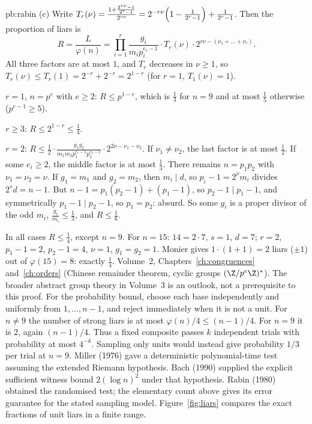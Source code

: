 \begin{solution}{pb:rabin}
(c) Write $T_r(\nu)=\frac{1+\frac{2^{r\nu}-1}{2^r-1}}{2^{r\nu}}=2^{-r\nu}\Bigl(1-\frac1{2^r-1}\Bigr)+\frac1{2^r-1}$. Then the proportion of liars is
\[
R=\frac{L}{\varphi(n)}=\prod_{i=1}^r\frac{g_i}{m_ip_i^{e_i-1}}\cdot T_r(\nu)\cdot2^{r\nu-(\nu_1+\dots+\nu_r)}.
\]
All three factors are at most $1$, and $T_r$ decreases in $\nu\ge1$, so $T_r(\nu)\le T_r(1)=2^{-r}+2^{-r}=2^{1-r}$ (for $r=1$,
$T_1(\nu)=1$).

\emph{$r=1$}, $n=p^e$ with $e\ge2$: $R\le p^{1-e}$, which is $\frac13$ for $n=9$ and at most $\frac15$ otherwise ($p^{e-1}\ge5$).

\emph{$r\ge3$}: $R\le2^{1-r}\le\frac14$.

\emph{$r=2$}: $R\le\frac12\cdot\frac{g_1g_2}{m_1m_2p_1^{e_1-1}p_2^{e_2-1}}\cdot2^{2\nu-\nu_1-\nu_2}$. If $\nu_1\ne\nu_2$, the last factor is at most
$\frac12$. If some $e_i\ge2$, the middle factor is at most $\frac13$. There remains $n=p_1p_2$ with $\nu_1=\nu_2=\nu$. If
$g_1=m_1$ and $g_2=m_2$, then $m_i\mid d$, so $p_i-1=2^\nu m_i$ divides $2^sd=n-1$. But $n-1=p_1(p_2-1)+(p_1-1)$, so $p_2-1\mid p_1-1$,
and symmetrically $p_1-1\mid p_2-1$, so $p_1=p_2$: absurd. So some $g_i$ is a proper divisor of the odd $m_i$, $\frac{g_i}{m_i}\le\frac13$,
and $R\le\frac16$.

In all cases $R\le\frac14$, except $n=9$. For $n=15$: $14=2\cdot7$, $s=1$, $d=7$; $r=2$, $p_1-1=2$, $p_2-1=4$, $\nu=1$, $g_1=g_2=1$. Monier
gives $1\cdot(1+1)=2$ liars ($\pm1$) out of $\varphi(15)=8$: exactly $\frac14$.
\tools Volume~2, Chapters~\ref{ch:congruences} and~\ref{ch:orders}
(Chinese remainder theorem, cyclic groups $(\Z/p^e\Z)^*$).
The broader abstract group theory in Volume~3 is an outlook, not a
prerequisite to this proof.
For the probability bound, choose each base independently and uniformly from $1,\ldots,n-1$, and reject immediately when it is not a unit. For $n\ne9$ the number of strong liars is at most $\varphi(n)/4\le(n-1)/4$. For $n=9$ it is $2$, again $(n-1)/4$. Thus a fixed composite passes $k$ independent trials with probability at most $4^{-k}$. Sampling only units would instead give probability $1/3$ per trial at $n=9$.
\leads Miller (1976) gave a deterministic polynomial-time test assuming the extended Riemann hypothesis. Bach (1990) supplied the explicit sufficient witness bound $2(\log n)^2$ under that hypothesis. Rabin (1980) obtained the randomised test; the elementary count above gives its error guarantee for the stated sampling model. Figure~\ref{fig:liars} compares the exact fractions of unit liars in a finite range.
\end{solution}



